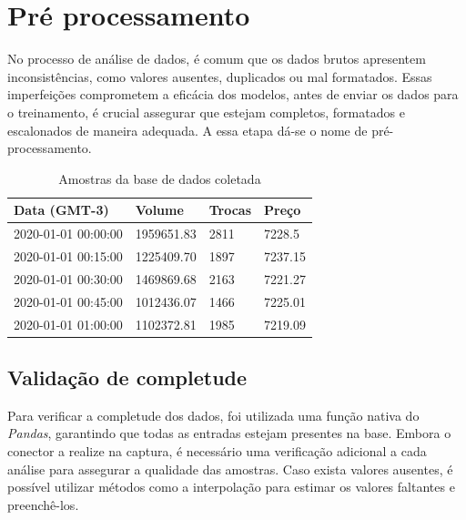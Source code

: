 \section{Pré processamento} \label{sec:preprocessamento}
No processo de análise de dados, é comum que os dados brutos apresentem inconsistências, como valores ausentes, duplicados ou mal formatados. 
Essas imperfeições comprometem a eficácia dos modelos, antes de enviar os dados para o treinamento, é crucial assegurar que estejam completos, formatados e escalonados de maneira adequada.
A essa etapa dá-se o nome de pré-processamento.

\begin{table}[!htb]
    \caption{Amostras da base de dados coletada} \label{tab:amostras}
    \begin{tabularx}{\textwidth}{X|X|X|X}
    \hline
    Data (GMT-3) & Volume & Trocas & Preço \\ \hline
    2020-01-01 00:00:00   & 1959651.83      & 2811            & 7228.5         \\ \hline
    2020-01-01 00:15:00   & 1225409.70      & 1897            & 7237.15        \\ \hline
    2020-01-01 00:30:00   & 1469869.68      & 2163            & 7221.27        \\ \hline
    2020-01-01 00:45:00   & 1012436.07      & 1466            & 7225.01        \\ \hline
    2020-01-01 01:00:00   & 1102372.81      & 1985            & 7219.09        \\ \hline
    \end{tabularx}
\end{table}

\subsection{Validação de completude} \label{sec:completude}
Para verificar a completude dos dados, foi utilizada uma função nativa do \textit{Pandas}, garantindo que todas as entradas estejam presentes na base.
Embora o conector a realize na captura, é necessário uma verificação adicional a cada análise para assegurar a qualidade das amostras. 
Caso exista valores ausentes, é possível utilizar métodos como a interpolação para estimar os valores faltantes e preenchê-los.

